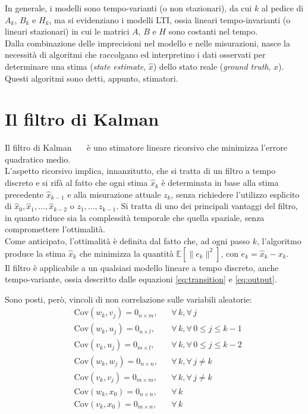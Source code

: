 \documentclass[12pt,a4paper,openright,twoside]{book}
\begin{document}
In generale, i modelli sono tempo-varianti (o non stazionari), da cui $k$ al pedice di $A_k$, $B_k$ e $H_k$, ma si evidenziano i modelli LTI, ossia lineari tempo-invarianti (o lineari stazionari) in cui le matrici $A$, $B$ e $H$ sono costanti nel tempo. \\

Dalla combinazione delle imprecisioni nel modello e nelle misurazioni, nasce la necessità di algoritmi che raccolgano ed interpretino i dati osservati per determinare una stima (\textit{state estimate}, $\hat{x}$) dello stato reale (\textit{ground truth}, $x$). Questi algoritmi sono detti, appunto, stimatori.

\section{Il filtro di Kalman}

Il filtro di Kalman~\cite{10.1115/1.3662552}~\cite{WelchB95}~\cite{10.1145/3363294} è uno stimatore lineare ricorsivo che minimizza l'errore quadratico medio. \\
L'aspetto ricorsivo implica, innanzitutto, che si tratta di un filtro a tempo discreto e si rifà al fatto che ogni stima $\hat{x}_k$ è determinata in base alla stima precedente $\hat{x}_{k-1}$ e alla misurazione attuale $z_k$, senza richiedere l'utilizzo esplicito di $\hat{x}_0,\hat{x}_1,...,\hat{x}_{k-2}$ o $z_1,...,z_{k-1}$. Si tratta di uno dei principali vantaggi del filtro, in quanto riduce sia la complessità temporale che quella spaziale, senza compromettere l'ottimalità. \\
Come anticipato, l'ottimalità è definita dal fatto che, ad ogni passo $k$, l'algoritmo produce la stima $\hat{x}_k$ che minimizza la quantità $\mathbb{E}[\lVert e_k\rVert^2]$, con $e_k=\hat{x}_k-x_k$. \\

Il filtro è applicabile a un qualsiasi modello lineare a tempo discreto, anche tempo-variante, ossia descritto dalle equazioni \ref{eq:transition} e \ref{eq:output}.

Sono posti, però, vincoli di non correlazione sulle variabili aleatorie:
\begin{align*}
& \mathrm{Cov}(w_k,v_j)=0_{n\times m}, && \forall\,k,\forall\,j \\
& \mathrm{Cov}(w_k,u_j)=0_{n\times l}, && \forall\,k,\forall\,0\leq j\leq k-1 \\
& \mathrm{Cov}(v_k,u_j)=0_{m\times l}, && \forall\,k,\forall\,0\leq j\leq k-2 \\
& \mathrm{Cov}(w_k,w_j)=0_{n\times n}, && \forall\,k,\forall\,j\neq k \\
& \mathrm{Cov}(v_k,v_j)=0_{m\times m}, && \forall\,k,\forall\,j\neq k \\
& \mathrm{Cov}(w_k,x_0)=0_{n\times n}, && \forall\,k \\
& \mathrm{Cov}(v_k,x_0)=0_{m\times n}, && \forall\,k
\end{align*}
\end{document}
